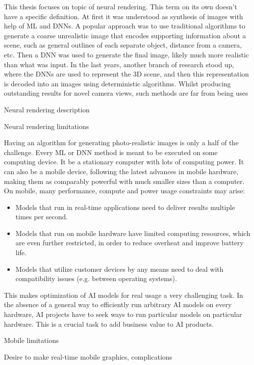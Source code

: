 This thesis focuses on topic of neural rendering. This term on its own doesn't have a specific definition. At first it was understood as synthesis of images with help of ML and DNNs. A popular approach was to use traditional algorithms to generate a coarse unrealistic image that encodes supporting information about a scene, such as general outlines of each separate object, distance from a camera, etc. Then a DNN was used to generate the final image, likely much more realistic than what was input. In the last years, another branch of research stood up, where the DNNs are used to represent the 3D scene, and then this representation is decoded into an images using deterministic algorithms. Whilst producing outstanding results for novel camera views, such methods are far from being uses 
 
 Neural rendering description
 
 Neural rendering limitations
 
 Having an algorithm for generating photo-realistic images is only a half of the challenge. Every ML or DNN method is meant to be executed on some computing device. It be a stationary computer with lots of computing power. It can also be a mobile device, following the latest advances in mobile hardware, making them as comparably powerful with much smaller sizes than a computer. On mobile, many performance, compute and power usage constraints may arise:
 \begin{itemize}
 	\item  Models that run in real-time applications need to deliver results multiple times per
 	second.
 	\item  Models that run on mobile hardware have limited computing resources, which are
 	even further restricted, in order to reduce overheat and improve battery life.
 	\item  Models that utilize customer devices by any means need to deal with compatibility
 	issues (e.g. between operating systems).
 \end{itemize}

 This makes optimization of AI models for real usage a very challenging task. In the
 absence of a general way to efficiently run arbitrary AI models on every hardware, AI
 projects have to seek ways to run particular models on particular hardware. This is a
 crucial task to add business value to AI products.

 
 Mobile limitations
 
 Desire to make real-time mobile graphics, complications
 

